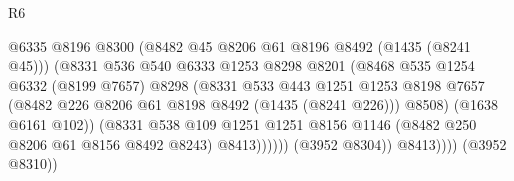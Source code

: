 \begin{lexlean}{R6}
\begin{coremodule}
                                              @6335
                                              @8196
                                              @8300
                                              (@8482 @45 @8206 @61 @8196 @8492 (@1435 (@8241 @45)))
                                              (@8331
                                                @536
                                                @540
                                                @6333
                                                @1253
                                                @8298
                                                @8201
                                                (@8468
                                                  @535
                                                  @1254
                                                  @6332
                                                  (@8199 @7657)
                                                  @8298
                                                  (@8331
                                                    @533
                                                    @443
                                                    @1251
                                                    @1253
                                                    @8198
                                                    @7657
                                                    (@8482
                                                      @226
                                                      @8206
                                                      @61
                                                      @8198
                                                      @8492
                                                      (@1435 (@8241 @226)))
                                                    @8508)
                                                  (@1638 @6161 @102))
                                                (@8331
                                                  @538
                                                  @109
                                                  @1251
                                                  @1251
                                                  @8156
                                                  @1146
                                                  (@8482 @250 @8206 @61 @8156 @8492 @8243)
                                                  @8413))))))
                                      (@3952 @8304))
                                    @8413))))
                            (@3952 @8310))

\end{coremodule}
\end{lexlean}
